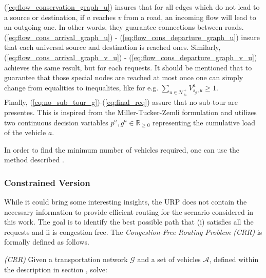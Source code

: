 (\ref{eq:flow_conservation_graph_u}) insures that for all edges which do not lead to a source or destination, if $a$ reaches $v$ from a road, an incoming flow will lead to an outgoing one. In other words, they guarantee connections between roads. (\ref{eq:flow_cons_arrival_graph_u}) -  (\ref{eq:flow_cons_departure_graph_u}) insure that each universal source and destination is reached ones. Similarly, (\ref{eq:flow_cons_arrival_graph_v_u}) -  (\ref{eq:flow_cons_departure_graph_v_u}) achieves the same result, but for each requests.  It should be mentioned that to guarantee that those special nodes are reached at most once one can simply change from equalities to inequalites, like for e.g. $\sum_{ u \in \mathcal{N}^+_{\underline{s_a}} }V^a_{ \underline{s_a},u} \ge 1$.\\
Finally, (\ref{eq:no_sub_tour_g})-(\ref{eq:final_req}) assure that no sub-tour are presentes. This is inspired from the Miller-Tucker-Zemli formulation and utilizes two continuous decision variables $p^a, g^a \in \mathbb{R}_{\ge0}$ representing the cumulative load of the vehicle $a$. 

In order to find the minimum number of vehicles required, one can use the method described . 
\subsubsection*{Constrained Version}
While it could bring some interesting insights, the URP does not contain the necessary information to provide efficient routing for the scenario considered in this work. The goal is to identify the best possible path that \textup{(i)} satisfies all the requests and \textup{ii} is congestion free. The \textit{Congestion-Free Routing Problem (CRR)} is formally defined as follows.\\ 
\begin{algori}{\textit{(CRR)}}
	Given a transportation network $\mathcal{G}$ and a set of vehicles $\mathcal{A}$, defined within the description in section , solve:
\end{algori}


